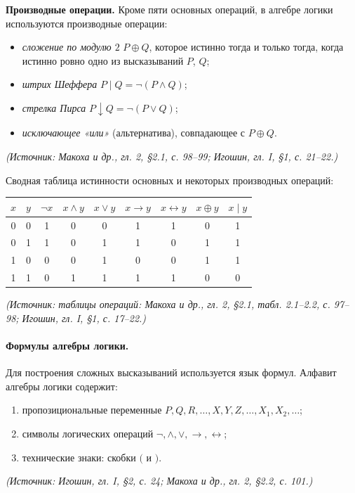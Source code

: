 \documentclass[a4paper,12pt]{article}
\begin{document}
\textbf{Производные операции.} Кроме пяти основных операций, в алгебре логики используются производные операции:
\begin{itemize}
\item \emph{сложение по модулю \(2\)} \(P\oplus Q\), которое истинно тогда и только тогда, когда истинно ровно одно из высказываний \(P\), \(Q\);
\item \emph{штрих Шеффера} \(P\mid Q=\neg(P\land Q)\);
\item \emph{стрелка Пирса} \(P\downarrow Q=\neg(P\lor Q)\);
\item \emph{исключающее «или»} (альтернатива), совпадающее с \(P\oplus Q\).
\end{itemize}
\textit{(Источник: Макоха и др., гл. 2, §2.1, с. 98--99; Игошин, гл. I, §1, с. 21--22.)}

Сводная таблица истинности основных и некоторых производных операций:
\begin{center}
\begin{tabular}{cc|ccccc|cc}
\toprule
\(x\) & \(y\) & \(\neg x\) & \(x\land y\) & \(x\lor y\) & \(x\to y\) & \(x\leftrightarrow y\) & \(x\oplus y\) & \(x\mid y\)\\
\midrule
0 & 0 & 1 & 0 & 0 & 1 & 1 & 0 & 1\\
0 & 1 & 1 & 0 & 1 & 1 & 0 & 1 & 1\\
1 & 0 & 0 & 0 & 1 & 0 & 0 & 1 & 1\\
1 & 1 & 0 & 1 & 1 & 1 & 1 & 0 & 0\\
\bottomrule
\end{tabular}
\end{center}
\textit{(Источник: таблицы операций: Макоха и др., гл. 2, §2.1, табл. 2.1--2.2, с. 97--98; Игошин, гл. I, §1, с. 17--22.)}

\paragraph{Формулы алгебры логики.}
Для построения сложных высказываний используется язык формул. Алфавит алгебры логики содержит:
\begin{enumerate}[label=\arabic*)]
\item пропозициональные переменные \(P,Q,R,\ldots,X,Y,Z,\ldots,X_1,X_2,\ldots\);
\item символы логических операций \(\neg,\land,\lor,\to,\leftrightarrow\);
\item технические знаки: скобки \((\) и \()\).
\end{enumerate}
\textit{(Источник: Игошин, гл. I, §2, с. 24; Макоха и др., гл. 2, §2.2, с. 101.)}
\end{document}

